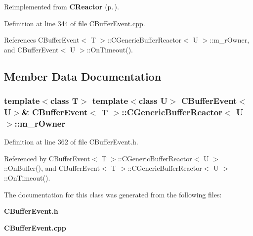 Reimplemented from {\bf CReactor} {\rm (p.\,\pageref{classCReactor_a8})}.

Definition at line 344 of file CBuffer\-Event.cpp.

References CBuffer\-Event$<$ T $>$::CGeneric\-Buffer\-Reactor$<$ U $>$::m\_\-r\-Owner, and CBuffer\-Event$<$ U $>$::On\-Timeout().

\subsection{Member Data Documentation}
\subsubsection{\setlength{\rightskip}{0pt plus 5cm}template$<$class T$>$ template$<$class U$>$ {\bf CBuffer\-Event}$<$U$>$\& {\bf CBuffer\-Event}$<$ T $>$::CGeneric\-Buffer\-Reactor$<$ U $>$::m\_\-r\-Owner\hspace{0.3cm}{\tt  [private]}}\label{classCBufferEvent_1_1CGenericBufferReactor_o0}




Definition at line 362 of file CBuffer\-Event.h.

Referenced by CBuffer\-Event$<$ T $>$::CGeneric\-Buffer\-Reactor$<$ U $>$::On\-Buffer(), and CBuffer\-Event$<$ T $>$::CGeneric\-Buffer\-Reactor$<$ U $>$::On\-Timeout().

The documentation for this class was generated from the following files:\begin{CompactItemize}
\item 
{\bf CBuffer\-Event.h}\item 
{\bf CBuffer\-Event.cpp}\end{CompactItemize}

